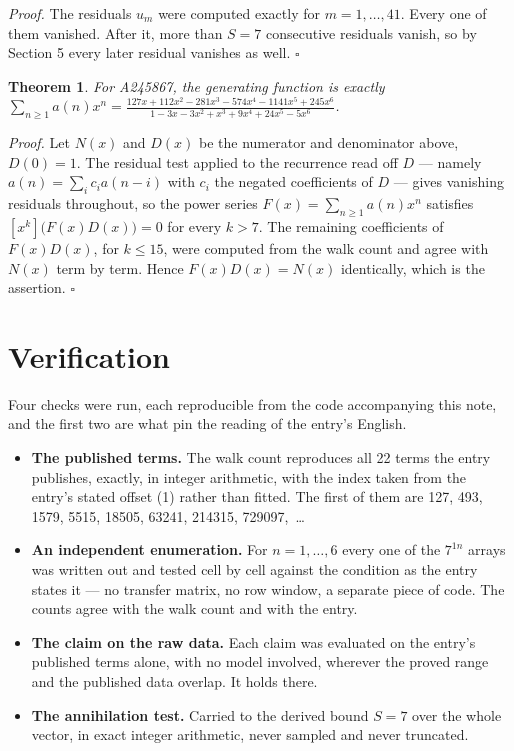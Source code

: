 \documentclass[11pt]{article}
\newtheorem{theorem}{Theorem}
\theoremstyle{definition}
\begin{document}
{\itshape Proof.} The residuals $u_m$ were computed exactly for $m = 1,\dots,41$. Every one of them vanished. After it, more than $S = 7$ consecutive residuals vanish, so by Section 5 every later residual vanishes as well. $\square$

\begin{theorem} For A245867, the generating function is exactly $\sum_{n\ge 1} a(n)x^n = \frac{127x + 112x^{2} - 281x^{3} - 574x^{4} - 1141x^{5} + 245x^{6}}{1 - 3x - 3x^{2} + x^{3} + 9x^{4} + 24x^{5} - 5x^{6}}$.\end{theorem}

{\itshape Proof.} Let $N(x)$ and $D(x)$ be the numerator and denominator above, $D(0)=1$. The residual test applied to the recurrence read off $D$ --- namely $a(n) = \sum_i c_i a(n-i)$ with $c_i$ the negated coefficients of $D$ --- gives vanishing residuals throughout, so the power series $F(x)=\sum_{n\ge 1}a(n)x^n$ satisfies $[x^k]\bigl(F(x)D(x)\bigr) = 0$ for every $k > 7$. The remaining coefficients of $F(x)D(x)$, for $k \le 15$, were computed from the walk count and agree with $N(x)$ term by term. Hence $F(x)D(x) = N(x)$ identically, which is the assertion. $\square$

\section{Verification}

Four checks were run, each reproducible from the code accompanying this note, and the first two are what pin the reading of the entry's English.

\begin{itemize}

\item {\bfseries The published terms.} The walk count reproduces all 22 terms the entry publishes, exactly, in integer arithmetic, with the index taken from the entry's stated offset (1) rather than fitted. The first of them are 127, 493, 1579, 5515, 18505, 63241, 214315, 729097,~\dots

\item {\bfseries An independent enumeration.} For $n = 1,\dots,6$ every one of the $7^{1n}$ arrays was written out and tested cell by cell against the condition as the entry states it --- no transfer matrix, no row window, a separate piece of code. The counts agree with the walk count and with the entry.

\item {\bfseries The claim on the raw data.} Each claim was evaluated on the entry's published terms alone, with no model involved, wherever the proved range and the published data overlap. It holds there.

\item {\bfseries The annihilation test.} Carried to the derived bound $S = 7$ over the whole vector, in exact integer arithmetic, never sampled and never truncated.

\end{itemize}
\end{document}
